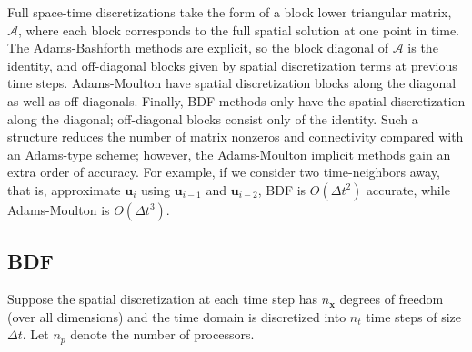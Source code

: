 \documentclass[a4paper,12pt]{article}
\begin{document}
Full space-time discretizations take the form of a block lower triangular matrix, $\mathcal{A}$, where each block corresponds to the full
spatial solution at one point in time. The Adams-Bashforth methods are explicit, so the block diagonal of $\mathcal{A}$ is the identity,
and off-diagonal blocks given by spatial discretization terms at previous time steps. Adams-Moulton have spatial discretization blocks
along the diagonal as well as off-diagonals. Finally, BDF methods only have the spatial discretization along the diagonal; off-diagonal
blocks consist only of the identity. Such a structure reduces the number of matrix nonzeros and connectivity compared with an
Adams-type scheme; however, the Adams-Moulton implicit methods gain an extra order of accuracy. For example, if we consider
two time-neighbors away, that is, approximate $\mathbf{u}_i$ using $\mathbf{u}_{i-1}$ and $\mathbf{u}_{i-2}$, BDF is $O(\Delta t^2)$
accurate, while Adams-Moulton is $O(\Delta t^3)$. 

\subsection{BDF}

Suppose the spatial discretization at each time step has $n_{\mathbf{x}}$ degrees of freedom (over all dimensions) and the time domain
is discretized into $n_t$ time steps of size $\Delta t$. Let $n_p$ denote the number of processors.


%
%
%
\end{document}
